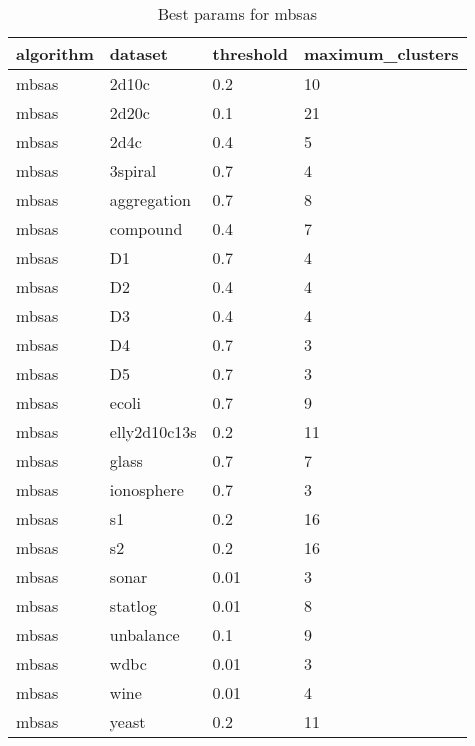 \begin{table}[H]
\centering
\caption{Best params for mbsas}
\label{S32_Table}
\begin{tabular}{|l|l|l|l|}
\hline
algorithm & dataset & threshold & maximum\_clusters \\
\hline
mbsas & 2d10c & 0.2 & 10 \\
\hline
mbsas & 2d20c & 0.1 & 21 \\
\hline
mbsas & 2d4c & 0.4 & 5 \\
\hline
mbsas & 3spiral & 0.7 & 4 \\
\hline
mbsas & aggregation & 0.7 & 8 \\
\hline
mbsas & compound & 0.4 & 7 \\
\hline
mbsas & D1 & 0.7 & 4 \\
\hline
mbsas & D2 & 0.4 & 4 \\
\hline
mbsas & D3 & 0.4 & 4 \\
\hline
mbsas & D4 & 0.7 & 3 \\
\hline
mbsas & D5 & 0.7 & 3 \\
\hline
mbsas & ecoli & 0.7 & 9 \\
\hline
mbsas & elly2d10c13s & 0.2 & 11 \\
\hline
mbsas & glass & 0.7 & 7 \\
\hline
mbsas & ionosphere & 0.7 & 3 \\
\hline
mbsas & s1 & 0.2 & 16 \\
\hline
mbsas & s2 & 0.2 & 16 \\
\hline
mbsas & sonar & 0.01 & 3 \\
\hline
mbsas & statlog & 0.01 & 8 \\
\hline
mbsas & unbalance & 0.1 & 9 \\
\hline
mbsas & wdbc & 0.01 & 3 \\
\hline
mbsas & wine & 0.01 & 4 \\
\hline
mbsas & yeast & 0.2 & 11 \\
\hline
\end{tabular}
\end{table}

\clearpage

